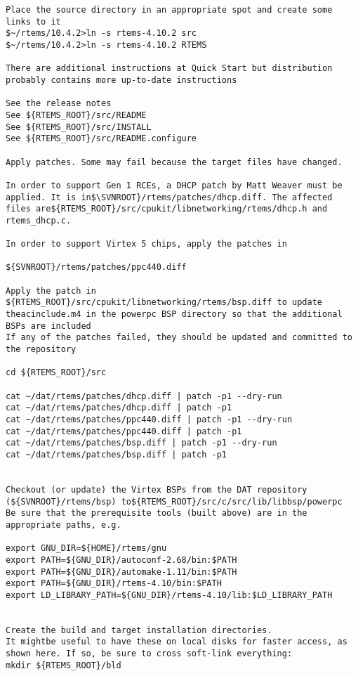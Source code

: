 \documentclass[11pt
  , a4paper
  , article
  , oneside
]{memoir}
\begin{document}
\begin{lstlisting}[style=termstyle]
 Place the source directory in an appropriate spot and create some links to it
$~/rtems/10.4.2>ln -s rtems-4.10.2 src
$~/rtems/10.4.2>ln -s rtems-4.10.2 RTEMS

There are additional instructions at Quick Start but distribution probably contains more up-to-date instructions

See the release notes
See ${RTEMS_ROOT}/src/README
See ${RTEMS_ROOT}/src/INSTALL
See ${RTEMS_ROOT}/src/README.configure

Apply patches. Some may fail because the target files have changed.

In order to support Gen 1 RCEs, a DHCP patch by Matt Weaver must be applied. It is in$\SVNROOT}/rtems/patches/dhcp.diff. The affected files are${RTEMS_ROOT}/src/cpukit/libnetworking/rtems/dhcp.h and rtems_dhcp.c.

In order to support Virtex 5 chips, apply the patches in 

${SVNROOT}/rtems/patches/ppc440.diff

Apply the patch in ${RTEMS_ROOT}/src/cpukit/libnetworking/rtems/bsp.diff to update 
theacinclude.m4 in the powerpc BSP directory so that the additional BSPs are included
If any of the patches failed, they should be updated and committed to the repository

cd ${RTEMS_ROOT}/src

cat ~/dat/rtems/patches/dhcp.diff | patch -p1 --dry-run
cat ~/dat/rtems/patches/dhcp.diff | patch -p1
cat ~/dat/rtems/patches/ppc440.diff | patch -p1 --dry-run
cat ~/dat/rtems/patches/ppc440.diff | patch -p1
cat ~/dat/rtems/patches/bsp.diff | patch -p1 --dry-run
cat ~/dat/rtems/patches/bsp.diff | patch -p1


Checkout (or update) the Virtex BSPs from the DAT repository (${SVNROOT}/rtems/bsp) to${RTEMS_ROOT}/src/c/src/lib/libbsp/powerpc
Be sure that the prerequisite tools (built above) are in the appropriate paths, e.g.

export GNU_DIR=${HOME}/rtems/gnu
export PATH=${GNU_DIR}/autoconf-2.68/bin:$PATH
export PATH=${GNU_DIR}/automake-1.11/bin:$PATH
export PATH=${GNU_DIR}/rtems-4.10/bin:$PATH
export LD_LIBRARY_PATH=${GNU_DIR}/rtems-4.10/lib:$LD_LIBRARY_PATH


Create the build and target installation directories.
It mightbe useful to have these on local disks for faster access, as shown here. If so, be sure to cross soft-link everything:
mkdir ${RTEMS_ROOT}/bld


\end{lstlisting}
\end{document}
